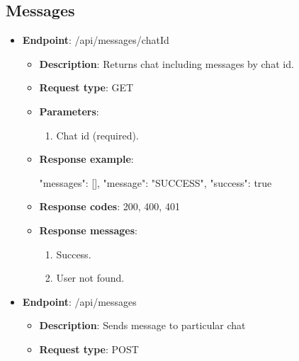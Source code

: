 \subsection{Messages}\label{subsec: messages}
\begin{itemize}
    \item \textbf{Endpoint}: /api/messages/{chatId}

    \begin{itemize}
        \item \textbf{Description}: Returns chat including messages by chat id.


        \item \textbf{Request type}: GET

        \item \textbf{Parameters}:
        \begin{enumerate}
            \item Chat id (required).
        \end{enumerate}

        \item \textbf{Response example}:

        \begin{spverbatim}
        {
            "messages": [],
            "message": "SUCCESS",
            "success": true
        }
        \end{spverbatim}

        \item \textbf{Response codes}: 200, 400, 401

        \item \textbf{Response messages}:
        \begin{enumerate}
            \item Success.
            \item User not found.
        \end{enumerate}
    \end{itemize}

    \item \textbf{Endpoint}: /api/messages

    \begin{itemize}
        \item \textbf{Description}: Sends message to particular chat

        \item \textbf{Request type}: POST


\end{itemize}
\end{itemize}
